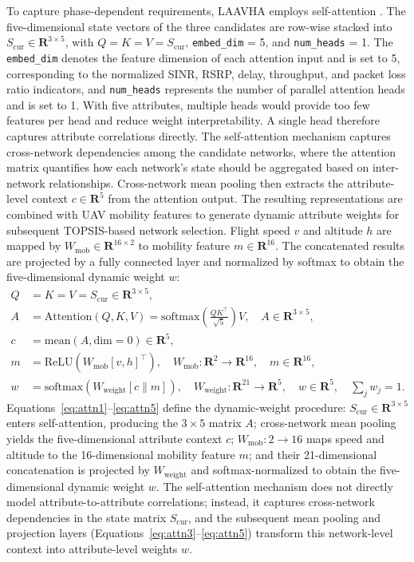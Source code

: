 \documentclass[final,3p,times,twocolumn]{elsarticle}
\begin{document}
To capture phase-dependent requirements, LAAVHA employs self-attention \cite{ref26,ref27}. The five-dimensional state vectors of the three candidates are row-wise stacked into $S_{\mathrm{cur}}\in\mathbf{R}^{3\times5}$, with $Q=K=V=S_{\mathrm{cur}}$, \texttt{embed\_dim} = 5, and \texttt{num\_heads} = 1. The \texttt{embed\_dim} denotes the feature dimension of each attention input and is set to 5, corresponding to the normalized SINR, RSRP, delay, throughput, and packet loss ratio indicators, and \texttt{num\_heads} represents the number of parallel attention heads and is set to 1. With five attributes, multiple heads would provide too few features per head and reduce weight interpretability. A single head therefore captures attribute correlations directly. The self-attention mechanism captures cross-network dependencies among the candidate networks, where the attention matrix quantifies how each network's state should be aggregated based on inter-network relationships. Cross-network mean pooling then extracts the attribute-level context $c\in\mathbf{R}^5$ from the attention output. The resulting representations are combined with UAV mobility features to generate dynamic attribute weights for subsequent TOPSIS-based network selection. Flight speed $v$ and altitude $h$ are mapped by $W_{\mathrm{mob}}\in\mathbf{R}^{16\times2}$ to mobility feature $m\in\mathbf{R}^{16}$. The concatenated results are projected by a fully connected layer and normalized by softmax to obtain the five-dimensional dynamic weight $w$:
\begin{align}
Q &= K = V = S_{\mathrm{cur}}\in\mathbf{R}^{3\times5}, \label{eq:attn1}\\
A &= \mathrm{Attention}(Q,K,V)=\mathrm{softmax}\!\left(\frac{QK^\top}{\sqrt{5}}\right)V,\quad A\in\mathbf{R}^{3\times5}, \label{eq:attn2}\\
c &= \mathrm{mean}(A,\mathrm{dim}=0)\in\mathbf{R}^5, \label{eq:attn3}\\
m &= \mathrm{ReLU}\!\left(W_{\mathrm{mob}}[v,h]^\top\right),\quad W_{\mathrm{mob}}:\mathbf{R}^{2}\rightarrow\mathbf{R}^{16},\quad m\in\mathbf{R}^{16}, \label{eq:attn4}\\
w &= \mathrm{softmax}\!\left(W_{\mathrm{weight}}[c\parallel m]\right),\quad W_{\mathrm{weight}}:\mathbf{R}^{21}\rightarrow\mathbf{R}^{5},\quad w\in\mathbf{R}^{5},\quad \sum_j w_j=1. \label{eq:attn5}
\end{align}
Equations~\eqref{eq:attn1}--\eqref{eq:attn5} define the dynamic-weight procedure: $S_{\mathrm{cur}}\in\mathbf{R}^{3\times5}$ enters self-attention, producing the $3\times5$ matrix $A$; cross-network mean pooling yields the five-dimensional attribute context $c$; $W_{\mathrm{mob}}:2\rightarrow16$ maps speed and altitude to the 16-dimensional mobility feature $m$; and their 21-dimensional concatenation is projected by $W_{\mathrm{weight}}$ and softmax-normalized to obtain the five-dimensional dynamic weight $w$. The self-attention mechanism does not directly model attribute-to-attribute correlations; instead, it captures cross-network dependencies in the state matrix $S_{\mathrm{cur}}$, and the subsequent mean pooling and projection layers (Equations~\eqref{eq:attn3}--\eqref{eq:attn5}) transform this network-level context into attribute-level weights $w$.
\end{document}
